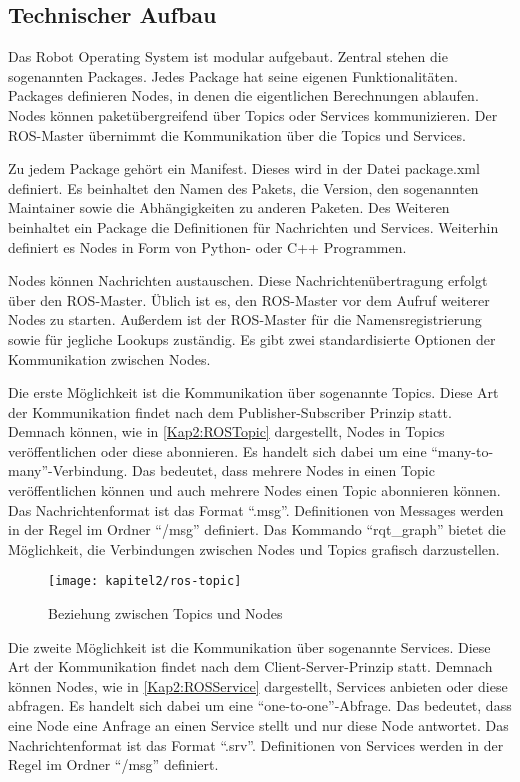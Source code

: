 \subsection{Technischer Aufbau}

Das Robot Operating System ist modular aufgebaut. Zentral stehen die sogenannten Packages. Jedes Package hat seine eigenen Funktionalitäten. Packages definieren Nodes, in denen die eigentlichen Berechnungen ablaufen. Nodes können paketübergreifend über Topics oder Services kommunizieren. Der \ac{ROS}-Master übernimmt die Kommunikation über die Topics und Services.

Zu jedem Package gehört ein Manifest. Dieses wird in der Datei package.xml definiert. Es beinhaltet den Namen des Pakets, die Version, den sogenannten Maintainer sowie die Abhängigkeiten zu anderen Paketen. Des Weiteren beinhaltet ein Package die Definitionen für Nachrichten und Services. Weiterhin definiert es Nodes in Form von Python- oder C++ Programmen.

Nodes können Nachrichten austauschen. Diese Nachrichtenübertragung erfolgt über den \ac{ROS}-Master. Üblich ist es, den \ac{ROS}-Master vor dem Aufruf weiterer Nodes zu starten. Außerdem ist der \ac{ROS}-Master für die Namensregistrierung sowie für jegliche Lookups zuständig. Es gibt zwei standardisierte Optionen der Kommunikation zwischen Nodes.

Die erste Möglichkeit ist die Kommunikation über sogenannte Topics. Diese Art der Kommunikation findet nach dem Publisher-Subscriber Prinzip statt. Demnach können, wie in \autoref{Kap2:ROSTopic} dargestellt, Nodes in Topics veröffentlichen oder diese abonnieren. Es handelt sich dabei um eine "`many-to-many"'-Verbindung. Das bedeutet, dass mehrere Nodes in einen Topic veröffentlichen können und auch mehrere Nodes einen Topic abonnieren können. Das Nachrichtenformat ist das Format "`.msg"'. Definitionen von Messages werden in der Regel im Ordner "`/msg"' definiert. Das Kommando "`rqt\_graph"' bietet die Möglichkeit, die Verbindungen zwischen Nodes und Topics grafisch darzustellen.

\begin{figure}[t]
  \centering
  \texttt{[image: kapitel2/ros-topic]}
  \caption{Beziehung zwischen Topics und Nodes}
  \label{Kap2:ROSTopic}
\end{figure}

Die zweite Möglichkeit ist die Kommunikation über sogenannte Services. Diese Art der Kommunikation findet nach dem Client-Server-Prinzip statt. Demnach können Nodes, wie in \autoref{Kap2:ROSService} dargestellt, Services anbieten oder diese abfragen. Es handelt sich dabei um eine "`one-to-one"'-Abfrage. Das bedeutet, dass eine Node eine Anfrage an einen Service stellt und nur diese Node antwortet. Das Nachrichtenformat ist das Format "`.srv"'. Definitionen von Services werden in der Regel im Ordner "`/msg"' definiert.

